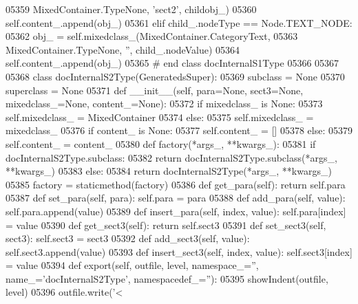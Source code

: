 \begin{DoxyCode}
{{{{{{{{{{{{{{{{{{{{{{{{{{{{{{{{{{{{{{{{{{{{{{{{{{{{{{{{{{{{{{{{{{{{{{{{{{{{{{{{{{{{{{{{{{{{{{{{{{{{{{{{{{{{{{{{{{{{{{{{{{{{{{{{{{{{{{{{{{{{{{{{{{{{{{{{{{{{{{{{{{{{{{{{{{{{{{{{{{{{{{{{{{{{{{{{{{{{{{{{{{{{{{{{{{{{{{{{{{{{{{{{{{{{{{{{{{{{{{{{{{{{{{{{{{{{{{{{{{{{{{{{{{{{{{{{{{{{{{{{{{{{{{{{{{{{{{{{{{{{{{{{{{{{{{{{{{{{{{{{{{{{{{{{{{{{{{{{{{{{05359                 MixedContainer.TypeNone, \textcolor{stringliteral}{'sect2'}, childobj\_)
05360             self.content\_.append(obj\_)
05361         \textcolor{keywordflow}{elif} child\_.nodeType == Node.TEXT\_NODE:
05362             obj\_ = self.mixedclass\_(MixedContainer.CategoryText,
05363                 MixedContainer.TypeNone, \textcolor{stringliteral}{''}, child\_.nodeValue)
05364             self.content\_.append(obj\_)
05365 \textcolor{comment}{# end class docInternalS1Type}
05366 
05367 
05368 \textcolor{keyword}{class }docInternalS2Type(GeneratedsSuper):
05369     subclass = \textcolor{keywordtype}{None}
05370     superclass = \textcolor{keywordtype}{None}
05371     \textcolor{keyword}{def }__init__(self, para=None, sect3=None, mixedclass\_=None, content\_=None):
05372         \textcolor{keywordflow}{if} mixedclass\_ \textcolor{keywordflow}{is} \textcolor{keywordtype}{None}:
05373             self.mixedclass_ = MixedContainer
05374         \textcolor{keywordflow}{else}:
05375             self.mixedclass_ = mixedclass\_
05376         \textcolor{keywordflow}{if} content\_ \textcolor{keywordflow}{is} \textcolor{keywordtype}{None}:
05377             self.content_ = []
05378         \textcolor{keywordflow}{else}:
05379             self.content_ = content\_
05380     \textcolor{keyword}{def }factory(*args\_, **kwargs\_):
05381         \textcolor{keywordflow}{if} docInternalS2Type.subclass:
05382             \textcolor{keywordflow}{return} docInternalS2Type.subclass(*args\_, **kwargs\_)
05383         \textcolor{keywordflow}{else}:
05384             \textcolor{keywordflow}{return} docInternalS2Type(*args\_, **kwargs\_)
05385     factory = staticmethod(factory)
05386     \textcolor{keyword}{def }get_para(self): \textcolor{keywordflow}{return} self.para
05387     \textcolor{keyword}{def }set_para(self, para): self.para = para
05388     \textcolor{keyword}{def }add_para(self, value): self.para.append(value)
05389     \textcolor{keyword}{def }insert_para(self, index, value): self.para[index] = value
05390     \textcolor{keyword}{def }get_sect3(self): \textcolor{keywordflow}{return} self.sect3
05391     \textcolor{keyword}{def }set_sect3(self, sect3): self.sect3 = sect3
05392     \textcolor{keyword}{def }add_sect3(self, value): self.sect3.append(value)
05393     \textcolor{keyword}{def }insert_sect3(self, index, value): self.sect3[index] = value
05394     \textcolor{keyword}{def }export(self, outfile, level, namespace\_='', name\_='docInternalS2Type', namespacedef\_=''):
05395         showIndent(outfile, level)
05396         outfile.write(\textcolor{stringliteral}{'<%
}}}}}}}}}}}}}}}}}}}}}}}}}}}}}}}}}}}}}}}}}}}}}}}}}}}}}}}}}}}}}}}}}}}}}}}}}}}}}}}}}}}}}}}}}}}}}}}}}}}}}}}}}}}}}}}}}}}}}}}}}}}}}}}}}}}}}}}}}}}}}}}}}}}}}}}}}}}}}}}}}}}}}}}}}}}}}}}}}}}}}}}}}}}}}}}}}}}}}}}}}}}}}}}}}}}}}}}}}}}}}}}}}}}}}}}}}}}}}}}}}}}}}}}}}}}}}}}}}}}}}}}}}}}}}}}}}}}}}}}}}}}}}}}}}}}}}}}}}}}}}}}}}}}}}}}}}}}}}}}}}}}}}}}}}}}}}}}}}}}}}
\end{DoxyCode}
